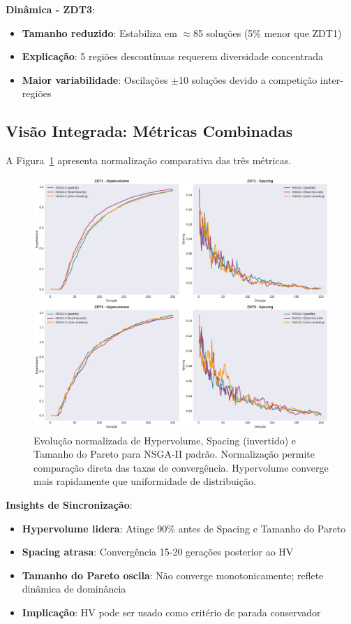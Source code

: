 \textbf{Dinâmica - ZDT3}:
\begin{itemize}
    \item \textbf{Tamanho reduzido}: Estabiliza em $\approx$85 soluções (5\% menor que ZDT1)
    \item \textbf{Explicação}: 5 regiões descontínuas requerem diversidade concentrada
    \item \textbf{Maior variabilidade}: Oscilações $\pm$10 soluções devido a competição inter-regiões
\end{itemize}

\subsection{Visão Integrada: Métricas Combinadas}

A Figura~\ref{fig:combined_metrics} apresenta normalização comparativa das três métricas.

\begin{figure}[H]
    \centering
    \includegraphics[width=\textwidth]{../plots/H_combined_metrics.pdf}
    \caption{Evolução normalizada de Hypervolume, Spacing (invertido) e Tamanho do Pareto para NSGA-II padrão. Normalização permite comparação direta das taxas de convergência. Hypervolume converge mais rapidamente que uniformidade de distribuição.}
    \label{fig:combined_metrics}
\end{figure}

\textbf{Insights de Sincronização}:
\begin{itemize}
    \item \textbf{Hypervolume lidera}: Atinge 90\% antes de Spacing e Tamanho do Pareto
    \item \textbf{Spacing atrasa}: Convergência 15-20 gerações posterior ao HV
    \item \textbf{Tamanho do Pareto oscila}: Não converge monotonicamente; reflete dinâmica de dominância
    \item \textbf{Implicação}: HV pode ser usado como critério de parada conservador
\end{itemize}

